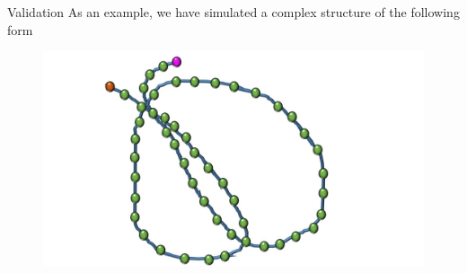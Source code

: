 \documentclass[8pt]{beamer}
\begin{document}
\begin{frame}{Validation}
As an example, we have simulated a complex structure of the following form 
\begin{figure}
\includegraphics[scale=0.15]{polymerModelWithCompositeStructure}
\end{figure}

\end{frame}
\end{document}
